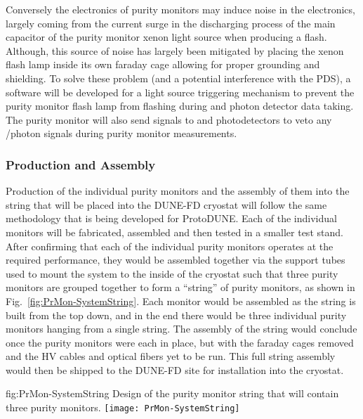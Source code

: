 Conversely the electronics of purity monitors may induce noise in the  electronics, largely coming from the current surge in the discharging process of the main capacitor of the purity monitor xenon light source when producing a flash.  Although, this source of noise has largely been mitigated by placing the xenon flash lamp inside its own faraday cage allowing for proper grounding and shielding.  
To solve these problem (and a potential interference with the PDS), a software will be developed for a light source triggering mechanism to prevent the purity monitor flash lamp from flashing during  and photon detector data taking. The purity monitor will also send signals to  and photodetectors to veto any /photon signals during purity monitor measurements. 


\subsubsection{Production and Assembly}
\label{sec:PrMon-Production-Assembly}
Production of the individual purity monitors and the assembly of them into the string that will be placed into the DUNE-FD cryostat will follow the same methodology that is being developed for ProtoDUNE.  Each of the individual monitors will be fabricated, assembled and then tested in a smaller test stand.  After confirming that each of the individual purity monitors operates at the required performance, they would be assembled together via the support tubes used to mount the system to the inside of the cryostat such that three purity monitors are grouped together to form a ``string'' of purity monitors, as shown in Fig.~\ref{fig:PrMon-SystemString}.
Each monitor would be assembled as the string is built from the top down, and in the end there would be three individual purity monitors hanging from a single string.  The assembly of the string would conclude once the purity monitors were each in place, but with the faraday cages removed and the HV cables and optical fibers yet to be run.  This full string assembly would then be shipped to the DUNE-FD site for installation into the cryostat.

\begin{dunefigure}{fig:PrMon-SystemString}
  {Design of the purity monitor string that will contain three purity monitors.}
  \texttt{[image: PrMon-SystemString]}
\end{dunefigure}




